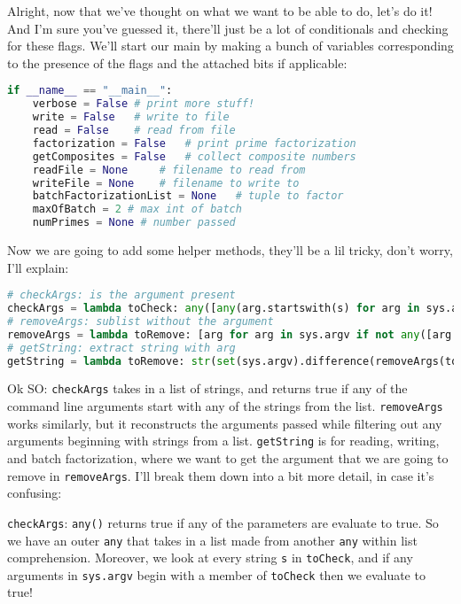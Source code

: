 \documentclass[11pt, twoside, reqno]{book}
\begin{document}
Alright, now that we've thought on what we want to be able to do, let's do it! And I'm sure you've guessed it, there'll just be a lot of conditionals and checking for these flags. We'll start our main by making a bunch of variables corresponding to the presence of the flags and the attached bits if applicable:
\begin{lstlisting}[language=Python]
if __name__ == "__main__":
    verbose = False # print more stuff!
    write = False   # write to file
    read = False    # read from file
    factorization = False   # print prime factorization
    getComposites = False   # collect composite numbers
    readFile = None     # filename to read from
    writeFile = None    # filename to write to
    batchFactorizationList = None   # tuple to factor
    maxOfBatch = 2 # max int of batch
    numPrimes = None # number passed
\end{lstlisting}

Now we are going to add some helper methods, they'll be a lil tricky, don't worry, I'll explain:
\begin{lstlisting}[language=Python]
# checkArgs: is the argument present
checkArgs = lambda toCheck: any([any(arg.startswith(s) for arg in sys.argv) for s in toCheck])
# removeArgs: sublist without the argument
removeArgs = lambda toRemove: [arg for arg in sys.argv if not any([arg.startswith(s) for s in toRemove])]
# getString: extract string with arg
getString = lambda toRemove: str(set(sys.argv).difference(removeArgs(toRemove)).pop()).split('=', 1)[1]
\end{lstlisting}

Ok SO: \texttt{checkArgs} takes in a list of strings, and returns true if any of the command line arguments start with any of the strings from the list. \texttt{removeArgs} works similarly, but it reconstructs the arguments passed while filtering out any arguments beginning with strings from a list. \texttt{getString} is for reading, writing, and batch factorization, where we want to get the argument that we are going to remove in \texttt{removeArgs}. I'll break them down into a bit more detail, in case it's confusing:

\texttt{checkArgs}: \texttt{any()} returns true if any of the parameters are evaluate to true. So we have an outer \texttt{any} that takes in a list made from another \texttt{any} within list comprehension. Moreover, we look at every string \texttt{s} in \texttt{toCheck}, and if any arguments in \texttt{sys.argv} begin with a member of \texttt{toCheck} then we evaluate to true!
\end{document}
